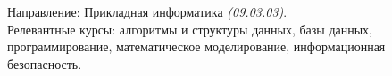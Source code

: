 
Направление: Прикладная информатика \textit{(09.03.03)}.\\
Релевантные курсы: алгоритмы и структуры данных, базы данных, программирование, математическое моделирование, информационная безопасность.
